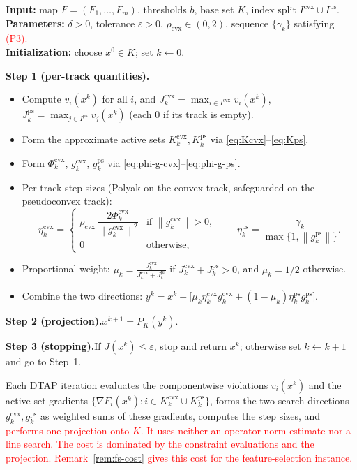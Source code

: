 \documentclass[]{interact}
\theoremstyle{plain}
\theoremstyle{definition}
\theoremstyle{remark}
\newcommand{\algstep}[1]{\smallskip\noindent\textbf{#1}}
\newcommand{\norm}[1]{\left\lVert #1 \right\rVert}
\newcommand{\cvx}{\mathrm{cvx}}
\newcommand{\ps}{\mathrm{ps}}
\newcommand{\dtap}{\textsc{DTAP}}
\begin{document}
\begin{algorithm}[H]
\caption{Dual-Track Adaptive Projection (DTAP) for the normal-box NSFP
\eqref{eq:nsfp-box}.}
\label{alg:dtap}
\small
\noindent\textbf{Input:} map $F=(F_1,\dots,F_m)$, thresholds $b$, base set $K$, index
split $I^{\cvx}\cup I^{\ps}$.\\
\textbf{Parameters:} $\delta>0$, tolerance $\varepsilon>0$, $\rho_{\cvx}\in(0,2)$,
sequence $\{\gamma_k\}$ satisfying \leavevmode\textcolor{red}{(P3).}\\
\textbf{Initialization:} choose $x^0\in K$; set $k\leftarrow 0$.

\algstep{Step 1 (per-track quantities).}
\begin{itemize}[leftmargin=1.6em,itemsep=1pt,topsep=2pt]
\item[(1a)] Compute $v_i(x^k)$ for all $i$, and $J^{\cvx}_k=\max_{i\in I^{\cvx}}v_i(x^k)$,
$J^{\ps}_k=\max_{j\in I^{\ps}}v_j(x^k)$ (each $0$ if its track is empty).
\item[(1b)] Form the approximate active sets $K^{\cvx}_k,K^{\ps}_k$ via
\eqref{eq:Kcvx}--\eqref{eq:Kps}.
\item[(1c)] Form $\Phi^{\cvx}_k$, $g^{\cvx}_k$, $g^{\ps}_k$ via
\eqref{eq:phi-g-cvx}--\eqref{eq:phi-g-ps}.
\item[(1d)] Per-track step sizes (Polyak on the convex track, safeguarded on the
pseudoconvex track):
\[
\eta^{\cvx}_k=\begin{cases}\rho_{\cvx}\,\dfrac{2\Phi^{\cvx}_k}{\norm{g^{\cvx}_k}^2} & \text{if }\norm{g^{\cvx}_k}>0,\\ 0 & \text{otherwise,}\end{cases}
\qquad
\eta^{\ps}_k=\frac{\gamma_k}{\max\{1,\norm{g^{\ps}_k}\}} .
\]
\item[(1e)] Proportional weight:
$\displaystyle \mu_k=\frac{J^{\cvx}_k}{J^{\cvx}_k+J^{\ps}_k}$ if
$J^{\cvx}_k+J^{\ps}_k>0$, and $\mu_k=1/2$ otherwise.
\item[(1f)] Combine the two directions:
$\displaystyle y^k=x^k-\bigl[\mu_k\eta^{\cvx}_k g^{\cvx}_k+(1-\mu_k)\eta^{\ps}_k g^{\ps}_k\bigr].$
\end{itemize}
\algstep{Step 2 (projection).}\quad $x^{k+1}=P_K(y^k)$.

\algstep{Step 3 (stopping).}\quad If $J(x^k)\le\varepsilon$, stop and return $x^k$; otherwise set $k\leftarrow k+1$ and go to Step~1.
\end{algorithm}

Each \dtap{} iteration evaluates the componentwise violations $v_i(x^k)$ and the active-set gradients $\{\nabla F_i(x^k):i\in K^{\cvx}_k\cup K^{\ps}_k\}$, forms the two search directions $g^{\cvx}_k,g^{\ps}_k$ as weighted sums of these gradients, computes the step sizes, and \leavevmode\textcolor{red}{performs one projection onto $K$. It uses neither an operator-norm estimate nor a line search. The cost is dominated by the constraint evaluations and the projection. Remark~\ref{rem:fs-cost} gives this cost for the feature-selection instance.}
\end{document}
